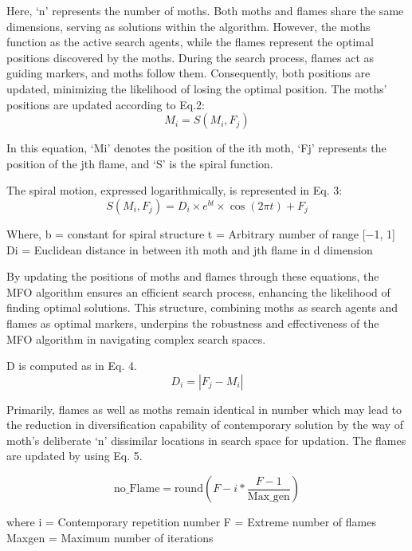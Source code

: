 \documentclass[conference]{IEEEtran}
\begin{document}
Here, ‘n’ represents the number of moths. Both moths and flames share the same dimensions, serving as solutions within the algorithm. However, the moths function as the active search agents, while the flames represent the optimal positions discovered by the moths. During the search process, flames act as guiding markers, and moths follow them. Consequently, both positions are updated, minimizing the likelihood of losing the optimal position. The moths' positions are updated according to Eq.2:
\begin{equation}
    M_i=S\left(M_i, F_j\right)
    \end{equation}

In this equation, ‘Mi’ denotes the position of the ith moth, ‘Fj’ represents the position of the jth flame, and ‘S’ is the spiral function.

The spiral motion, expressed logarithmically, is represented in Eq. 3:
\begin{equation}
    S\left(M_i, F_j\right)=D_i \times e^{b t} \times \cos (2 \pi t)+F_j
    \end{equation}

Where,
b = constant for spiral structure
 t = Arbitrary number of range [−1, 1]
 Di = Euclidean distance in between ith moth and jth flame in d dimension

By updating the positions of moths and flames through these equations, the MFO algorithm ensures an efficient search process, enhancing the likelihood of finding optimal solutions. This structure, combining moths as search agents and flames as optimal markers, underpins the robustness and effectiveness of the MFO algorithm in navigating complex search spaces.

D is computed as in Eq. 4.	
\begin{equation}
    D_i=\left|F_j-M_i\right|
    \end{equation}

Primarily, flames as well as moths remain identical in number which may lead to the reduction in diversification capability of contemporary solution by the way of moth’s deliberate ‘n’ dissimilar locations in search space for updation. The flames are updated by using Eq. 5. 

\begin{equation}
\mathrm{no\_Flame} = \mathrm{round}\left(F - i \ast \frac{F - 1}{\mathrm{Max\_gen}}\right)
\end{equation}

where				
i = Contemporary repetition number
F = Extreme number of flames
Maxgen = Maximum number of iterations 
\end{document}
